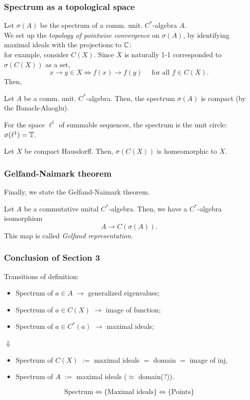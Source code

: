 \documentclass[10pt,handout]{beamer}
\begin{document}
\begin{frame}
\frametitle{Spectrum as a topological space}
  Let $\sigma(A)$ be the spectrum of a comm. unit. $C^*$-algebra $A$.\\
  \smallskip
  \pause We set up the \emph{topology of pointwise convergence} on $\sigma(A)$, by identifying maximal ideals with the projections to $\mathbb{C}$:\\
  \smallskip
  for example, consider $C(X)$.
  Since $X$ is naturally 1-1 corresponded to $\sigma(C(X))$ as a set,
  \[x\to y\in X \iff f(x)\to f(y)\quad\text{ for all }f\in C(X).\]
  \pause
  Then,
  \begin{prop}
    Let $A$ be a comm. unit. $C^*$-algebra.
    Then, the spectrum $\sigma(A)$ is compact (by the Banach-Alaoglu).
  \end{prop}
  \pause
  \begin{ex}
    For the space $\ell^1$ of summable sequences, the spectrum is the unit circle: $\sigma(\ell^1)=\mathbb{T}$.
  \end{ex}
  \begin{ex}
    Let $X$ be compact Hausdorff. Then, $\sigma(C(X))$ is homeomorphic to $X$.
  \end{ex}
\end{frame}

\begin{frame}
\frametitle{Gelfand-Naimark theorem}
  Finally, we state the Gelfand-Naimark theorem. \pause
  \begin{thm}
    Let $A$ be a commutative unital $C^*$-algebra.
    Then, we have a $C^*$-algebra isomorphism
    \[A\to C(\sigma(A)).\]
    This map is called \emph{Gelfand representation}.
  \end{thm}
\end{frame}

\begin{frame}
\frametitle{Conclusion of Section 3}
  Transitions of definition:
  \begin{itemize}
    \item Spectrum of $a\in A$ $\to$ generalized eigenvalues;
    \item Spectrum of $a\in C(X)$ $\to$ image of function;
    \item Spectrum of $a\in C^*(a)$ $\to$ maximal ideals;
  \end{itemize}
  \hspace{10em}$\Downarrow$
  \begin{itemize}
    \item Spectrum of $C(X)$ $:=$ maximal ideals $=$ domain $=$ image of inj,\\
    \item Spectrum of $A$ $:=$ maximal ideals ($\approx$ domain(?)).
  \end{itemize}
  \bigskip
  \[\text{Spectrum}\iff\{\text{Maximal ideals}\}\iff\{\text{Points}\}\]
\end{frame}
\end{document}
